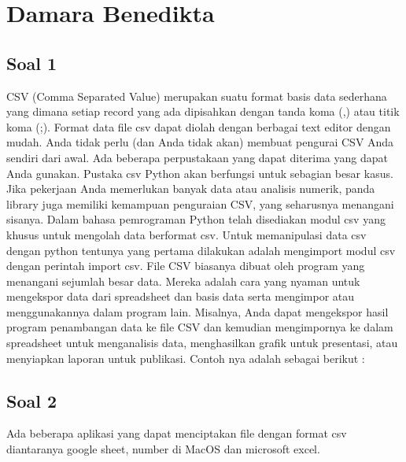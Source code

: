 \section{Damara Benedikta}
\subsection{Soal 1}
 CSV (Comma Separated Value) merupakan suatu  format basis data sederhana yang dimana setiap record yang ada dipisahkan dengan tanda koma (,) atau titik koma (;). Format data file csv dapat diolah dengan berbagai text editor dengan mudah. Anda tidak perlu (dan Anda tidak akan) membuat pengurai CSV Anda sendiri dari awal. Ada beberapa perpustakaan yang dapat diterima yang dapat Anda gunakan. Pustaka csv Python akan berfungsi untuk sebagian besar kasus. Jika pekerjaan Anda memerlukan banyak data atau analisis numerik, panda library juga memiliki kemampuan penguraian CSV, yang seharusnya menangani sisanya. Dalam bahasa pemrograman Python telah disediakan modul csv yang khusus untuk mengolah data berformat csv.  Untuk memanipulasi data csv dengan python tentunya yang pertama dilakukan adalah mengimport modul csv dengan perintah import csv. File CSV biasanya dibuat oleh program yang menangani sejumlah besar data. Mereka adalah cara yang nyaman untuk mengekspor data dari spreadsheet dan basis data serta mengimpor atau menggunakannya dalam program lain. Misalnya, Anda dapat mengekspor hasil program penambangan data ke file CSV dan kemudian mengimpornya ke dalam spreadsheet untuk menganalisis data, menghasilkan grafik untuk presentasi, atau menyiapkan laporan untuk publikasi. Contoh nya adalah sebagai berikut :

 

\subsection{Soal 2} 
 Ada beberapa aplikasi yang dapat menciptakan file dengan format csv diantaranya google sheet, number di MacOS dan microsoft excel.

